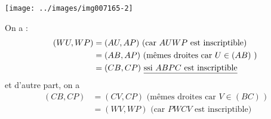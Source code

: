 {\begin{enumerate}
{\begin{center}
\texttt{[image: ../images/img007165-2]}
\end{center}
On a :
\begin{align*}
(WU,WP)
&= (AU,AP) \text{ (car $AUWP$ est inscriptible)}\\
&= (AB,AP) \text{ (mêmes droites car $U\in (AB)$ )}\\
&= (CB,CP) \text{ \underline{ssi $ABPC$ est inscriptible}}
\end{align*}
et d'autre part, on a 
\begin{align*}
(CB,CP)
&= (CV,CP) \text{ (mêmes droites car $V\in (BC)$ )}\\
&= (WV,WP) \text{ (car $PWCV$ est inscriptible)}
\end{align*}
}
\end{enumerate}
}
